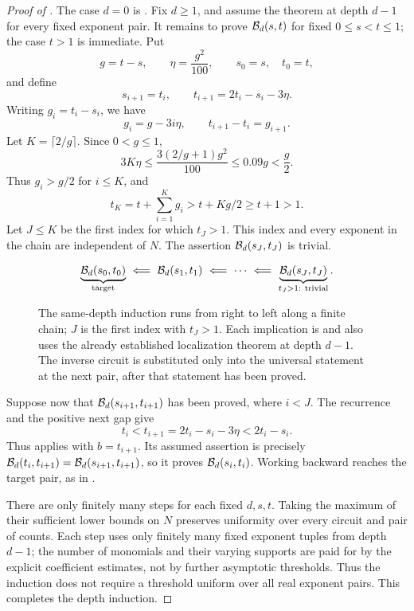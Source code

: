 \begin{proof}[Proof of ]
The case \(d=0\) is . Fix \(d\ge1\), and assume the
theorem at depth \(d-1\) for every fixed exponent pair.
It remains to prove \(\mathcal B_d(s,t)\) for fixed \(0\le s<t\le1\);
the case \(t>1\) is immediate.
Put
\[
 g=t-s,\qquad \eta=\frac{g^2}{100},\qquad
 s_0=s,\quad t_0=t,
\]
and define
\begin{equation}
\label{eq:scale-recurrence}
 s_{i+1}=t_i,\qquad t_{i+1}=2t_i-s_i-3\eta.
\end{equation}
Writing \(g_i=t_i-s_i\), we have
\[
 g_i=g-3i\eta,\qquad t_{i+1}-t_i=g_{i+1}.
\]
Let \(K=\lceil2/g\rceil\). Since \(0<g\le1\),
\[
 3K\eta\le \frac{3(2/g+1)g^2}{100}
 \le0.09g<\frac g2.
\]
Thus \(g_i>g/2\) for \(i\le K\), and
\[
 t_K=t+\sum_{i=1}^K g_i>t+Kg/2\ge t+1>1.
\]
Let \(J\le K\) be the first index for which \(t_J>1\).
This index and every exponent in the chain are independent of \(N\).
The assertion \(\mathcal B_d(s_J,t_J)\) is trivial.

\begin{figure}[htbp]
\centering
\[
\underbrace{\mathcal B_d(s_0,t_0)}_{\text{target}}
\ \Longleftarrow\
\mathcal B_d(s_1,t_1)
\ \Longleftarrow\ \cdots\ \Longleftarrow\
\underbrace{\mathcal B_d(s_J,t_J)}_{t_J>1:\ \text{trivial}} .
\]
\caption{The same-depth induction runs from right to left along a
finite chain; \(J\) is the first index with \(t_J>1\).
Each implication is \Cref{lem:backward} and also uses
the already established localization theorem at depth \(d-1\).
The inverse circuit is substituted only into the universal statement
at the next pair, after that statement has been proved.}
\label{fig:scales}
\end{figure}

Suppose now that $\mathcal B_d(s_{i+1},t_{i+1})$ has been proved,
where $i<J$. The recurrence and the positive next gap give
\[
 t_i<t_{i+1}=2t_i-s_i-3\eta<2t_i-s_i.
\]
Thus  applies with $b=t_{i+1}$. Its assumed
assertion is precisely
$\mathcal B_d(t_i,t_{i+1})=\mathcal B_d(s_{i+1},t_{i+1})$, so it proves
$\mathcal B_d(s_i,t_i)$.
Working backward reaches the target pair, as in .

There are only finitely many steps for each fixed \(d,s,t\).
Taking the maximum of their sufficient lower bounds on \(N\)
preserves uniformity over every circuit and pair of counts. Each step
uses only finitely many fixed exponent tuples from depth $d-1$; the
number of monomials and their varying supports are paid for by the
explicit coefficient estimates, not by further asymptotic thresholds.
Thus the induction does not require a threshold uniform over all real
exponent pairs. This completes the depth induction.
\end{proof}
